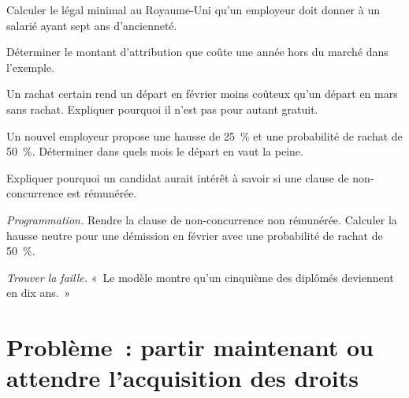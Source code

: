 \begin{exercise}[$\star$]\label{exo:in:career-paths-and-moves:2}
Calculer le  légal minimal au Royaume-Uni qu'un employeur doit donner à un salarié ayant sept ans d'ancienneté.
\end{exercise}

\begin{exercise}[$\star$]\label{exo:in:career-paths-and-moves:3}
Déterminer le montant d'attribution que coûte une année hors du marché dans l'exemple.
\end{exercise}

\begin{exercise}[$\star\star$]\label{exo:in:career-paths-and-moves:4}
Un rachat certain rend un départ en février moins coûteux qu'un départ en mars sans rachat. Expliquer pourquoi il n'est pas pour autant gratuit.
\end{exercise}

\begin{exercise}[$\star\star$]\label{exo:in:career-paths-and-moves:5}
Un nouvel employeur propose une hausse de 25~\% et une probabilité de rachat de 50~\%. Déterminer dans quels mois le départ en vaut la peine.
\end{exercise}

\begin{exercise}[$\star\star$]\label{exo:in:career-paths-and-moves:6}
Expliquer pourquoi un candidat aurait intérêt à savoir si une clause de non-concurrence est rémunérée.
\end{exercise}

\begin{exercise}[$\star\star\star$]\label{exo:in:career-paths-and-moves:7}
\emph{Programmation.} Rendre la clause de non-concurrence non rémunérée. Calculer la hausse neutre pour une démission en février avec
une probabilité de rachat de 50~\%.
\end{exercise}

\begin{exercise}[$\star\star\star$]\label{exo:in:career-paths-and-moves:8}
\emph{Trouver la faille.} «~Le modèle montre qu'un cinquième des diplômés deviennent  en dix ans.~»
\end{exercise}

\section{Problème~: partir maintenant ou attendre l'acquisition des droits}

